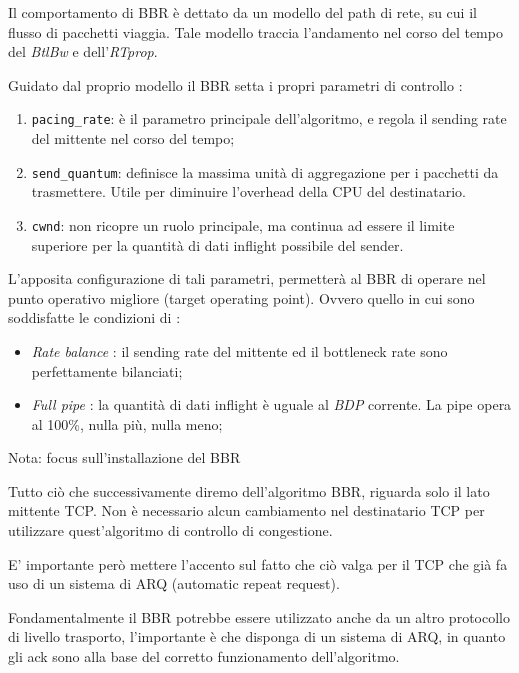 Il comportamento di BBR è dettato da un modello del path di rete, su cui il flusso di pacchetti viaggia. Tale modello traccia l'andamento nel corso del tempo del \textit{BtlBw} e dell'\textit{RTprop}. \bigskip

Guidato dal proprio modello il BBR setta i propri parametri di controllo :

\begin{enumerate}

\item \texttt{pacing\_rate}: è il parametro principale dell'algoritmo, e regola il sending rate del mittente nel corso del tempo;

\item \texttt{send\_quantum}: definisce la massima unità di aggregazione per i pacchetti da trasmettere. Utile per diminuire l'overhead della CPU del destinatario.

\item \texttt{cwnd}: non ricopre un ruolo principale, ma continua ad essere il limite superiore per la quantità di dati inflight possibile del sender. 

\end{enumerate}

L'apposita configurazione di tali parametri, permetterà al BBR di operare nel punto operativo migliore (target operating point). Ovvero quello in cui sono soddisfatte le condizioni di :

\begin{itemize}

\item \textit{Rate balance} : il sending rate del mittente ed il bottleneck rate sono perfettamente bilanciati;

\item \textit{Full pipe} : la quantità di dati inflight è uguale al \textit{BDP} corrente. La pipe opera al 100\%, nulla più, nulla meno;

\end{itemize}

\begin{nota}{Nota: focus sull'installazione del BBR}

Tutto ciò che successivamente diremo dell'algoritmo BBR, riguarda solo il lato mittente TCP. Non è necessario alcun cambiamento nel destinatario TCP per utilizzare quest'algoritmo di controllo di congestione. \bigskip

E' importante però mettere l'accento sul fatto che ciò valga per il TCP che già fa uso di un sistema di ARQ (automatic repeat request). \bigskip

Fondamentalmente il BBR potrebbe essere utilizzato anche da un altro protocollo di livello trasporto, l'importante è che disponga di un sistema di ARQ, in quanto gli ack sono alla base del corretto funzionamento dell'algoritmo.

\end{nota}

